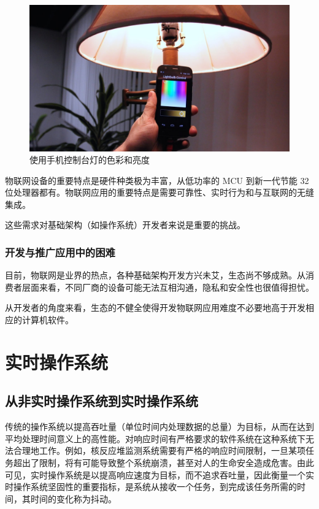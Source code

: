 \documentclass{ctexart}
\begin{document}
\begin{figure}
	\centering
	\includegraphics[scale=0.27]{Lightbulb.jpg}
	\caption{使用手机控制台灯的色彩和亮度}
\end{figure}

物联网设备的重要特点是硬件种类极为丰富，从低功率的 MCU 到新一代节能 32 位处理器都有。物联网应用的重要特点是需要可靠性、实时行为和与互联网的无缝集成。

这些需求对基础架构（如操作系统）开发者来说是重要的挑战。

\subsubsection{开发与推广应用中的困难}

目前，物联网是业界的热点，各种基础架构开发方兴未艾，生态尚不够成熟。从消费者层面来看，不同厂商的设备可能无法互相沟通，隐私和安全性也很值得担忧。

从开发者的角度来看，生态的不健全使得开发物联网应用难度不必要地高于开发相应的计算机软件。

\section{实时操作系统}

\subsection{从非实时操作系统到实时操作系统}

传统的操作系统以提高吞吐量（单位时间内处理数据的总量）为目标，从而在达到平均处理时间意义上的高性能。对响应时间有严格要求的软件系统在这种系统下无法合理地工作。例如，核反应堆监测系统需要有严格的响应时间限制，一旦某项任务超出了限制，将有可能导致整个系统崩溃，甚至对人的生命安全造成危害。由此可见，实时操作系统是以提高响应速度为目标，而不追求吞吐量，因此衡量一个实时操作系统坚固性的重要指标，是系统从接收一个任务，到完成该任务所需的时间，其时间的变化称为抖动。
\end{document}
